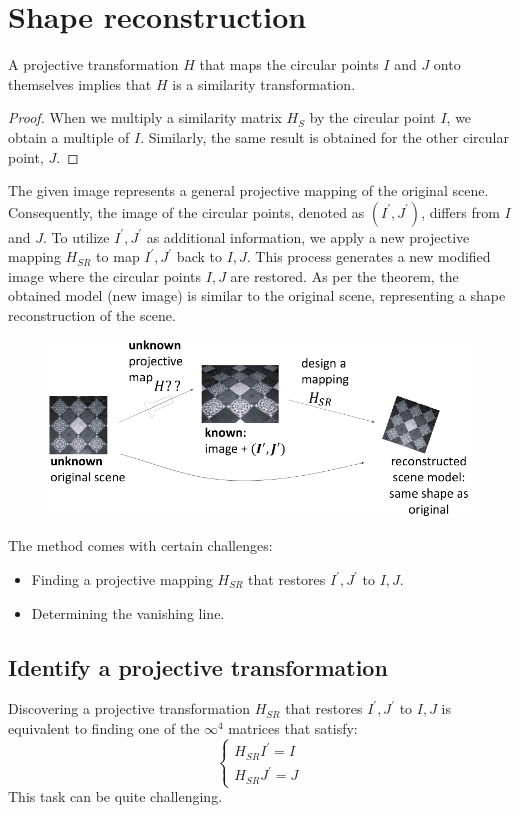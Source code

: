 \section{Shape reconstruction}

\begin{theorem}
    A projective transformation $H$ that maps the circular points $I$ and $J$ onto themselves implies that $H$ is a similarity transformation. 
\end{theorem}
\begin{proof}
    When we multiply a similarity matrix $H_S$ by the circular point $I$, we obtain a multiple of $I$.
    Similarly, the same result is obtained for the other circular point, $J$.
\end{proof}
The given image represents a general projective mapping of the original scene. 
Consequently, the image of the circular points, denoted as $(I^{'},J^{'})$, differs from $I$ and $J$. 
To utilize $I^{'},J^{'}$ as additional information, we apply a new projective mapping $H_{SR}$ to map $I^{'},J^{'}$ back to $I,J$. 
This process generates a new modified image where the circular points $I,J$ are restored.
As per the theorem, the obtained model (new image) is similar to the original scene, representing a shape reconstruction of the scene.
\begin{figure}[H]
    \centering
    \includegraphics[width=0.75\linewidth]{images/HSR.png}
\end{figure}
The method comes with certain challenges:
\begin{itemize}
    \item Finding a projective mapping $H_{SR}$ that restores $I^{'},J^{'}$ to $I,J$. 
    \item Determining the vanishing line.
\end{itemize}

\subsection*{Identify a projective transformation}
Discovering a projective transformation $H_{SR}$ that restores $I^{'}, J^{'}$ to $I, J$ is equivalent to finding one of the $\infty^{4}$ matrices that satisfy:
\[\begin{cases}
    H_{SR}I^{'}=I \\
    H_{SR}J^{'}=J
\end{cases}\]
This task can be quite challenging.

